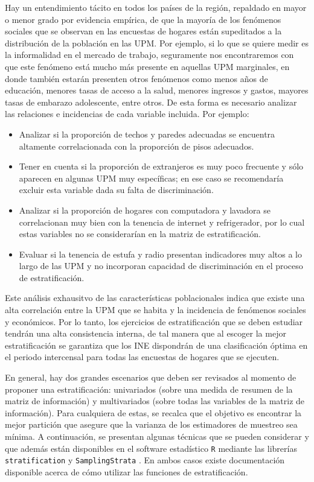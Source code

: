 \documentclass[
  12pt,
  spanish,
]{book}
\providecommand{\tightlist}{%
  \setlength{\itemsep}{0pt}\setlength{\parskip}{0pt}}
\begin{document}
Hay un entendimiento tácito en todos los países de la región, repaldado en mayor o menor grado por evidencia empírica, de que la mayoría de los fenómenos sociales que se observan en las encuestas de hogares están supeditados a la distribución de la población en las UPM. Por ejemplo, si lo que se quiere medir es la informalidad en el mercado de trabajo, seguramente nos encontraremos con que este fenómeno está mucho más presente en aquellas UPM marginales, en donde también estarán presenten otros fenómenos como menos años de educación, menores tasas de acceso a la salud, menores ingresos y gastos, mayores tasas de embarazo adolescente, entre otros. De esta forma es necesario analizar las relaciones e incidencias de cada variable incluida. Por ejemplo:

\begin{itemize}
\tightlist
\item
  Analizar si la proporción de techos y paredes adecuadas se encuentra altamente correlacionada con la proporción de pisos adecuados.
\item
  Tener en cuenta si la proporción de extranjeros es muy poco frecuente y sólo aparecen en algunas UPM muy específicas; en ese caso se recomendaría excluir esta variable dada su falta de discriminación.
\item
  Analizar si la proporción de hogares con computadora y lavadora se correlacionan muy bien con la tenencia de internet y refrigerador, por lo cual estas variables no se considerarían en la matriz de estratificación.
\item
  Evaluar si la tenencia de estufa y radio presentan indicadores muy altos a lo largo de las UPM y no incorporan capacidad de discriminación en el proceso de estratificación.
\end{itemize}

Este análisis exhausitvo de las características poblacionales indica que existe una alta correlación entre la UPM que se habita y la incidencia de fenómenos sociales y económicos. Por lo tanto, los ejercicios de estratificación que se deben estudiar tendrán una alta consistencia interna, de tal manera que al escoger la mejor estratificación se garantiza que los INE dispondrán de una clasificación óptima en el periodo intercensal para todas las encuestas de hogares que se ejecuten.

En general, hay dos grandes escenarios que deben ser revisados al momento de proponer una estratificación: univariados (sobre una medida de resumen de la matriz de información) y multivariados (sobre todas las variables de la matriz de información). Para cualquiera de estas, se recalca que el objetivo es encontrar la mejor partición que asegure que la varianza de los estimadores de muestreo sea mínima. A continuación, se presentan algunas técnicas que se pueden considerar y que además están disponibles en el software estadístico \texttt{R} mediante las librerías \texttt{stratification} \citep{Baillargeon_Rivest_2011} y \texttt{SamplingStrata} \citep{Barcaroli_2014}. En ambos casos existe documentación disponible acerca de cómo utilizar las funciones de estratificación.
\end{document}
